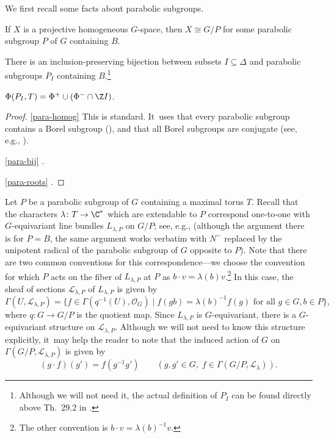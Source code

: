 \pagebreak[2]
We first recall some facts about parabolic subgroups.

\skpt
\begin{lem}\label{para-facts}
\begin{enumeratea}
\item\label{para-homog} If $X$ is a projective homogeneous $G$-space, then $X\cong G/P$ for some parabolic subgroup $P$ of $G$ containing $B$.

\item\label{para-bij} There is an inclusion-preserving bijection between subsets $I\subseteq \Delta$ and parabolic subgroups $P_I$ containing $B$.\footnote{Although we will not need it, the actual definition of $P_I$ can be found directly above Th.~29.2 in \cite{Hum75}.}
\item\label{para-roots} $\Phi(P_I, T) = \Phi^+\cup (\Phi^-\cap \Z I)$.
\end{enumeratea}
\end{lem}

\skpt
\begin{proof}
\eqref{para-homog} This is standard. It~uses that every parabolic subgroup contains a Borel subgroup (\cite[Cor.\,21.3.B.]{Hum75}), and that all Borel subgroups are conjugate (see, e.g., \cite[Th.\,21.3]{Hum75}).

\eqref{para-bij} \cite[Th.\,29.3]{Hum75}.

\eqref{para-roots} \cite[Th.\,30.1]{Hum75}.
\end{proof}

Let $P$ be a parabolic subgroup of $G$ containing a maximal torus $T$. Recall that the characters $\lambda\colon T\to \C^*$ which are extendable to $P$ correspond one-to-one with $G$-equivariant line bundles $L_{\lambda,P}$ on $G/P$; see, e.g., \cite[\S9.11]{Hotta} (although the argument there is for $P=B$, the same argument works verbatim with $N^{-}$ replaced by the unipotent radical of the parabolic subgroup of $G$ opposite to $P$). Note that there are two common conventions for this correspondence---we choose the convention for which $P$ acts on the fiber of $L_{\lambda,P}$ at $P$ as $b\cdot v = \lambda(b)v$.\footnote{The other convention is $b\cdot v = \lambda(b)^{-1}v$.} In this case, the sheaf of sections $\mathscr{L}_{\lambda,P}$ of $L_{\lambda,P}$ is given by
\begin{equation}\label{eq:borel-L-lambda}
\Gamma(U, \mathscr{L}_{\lambda,P}) = \{f\in \Gamma(q^{-1}(U), \mathscr{O}_G) \mid f(gb) = \lambda(b)^{-1}f(g)\text{ for all }g\in G, b\in P\},
\end{equation}
where $q\colon G\to G/P$ is the quotient map. Since $L_{\lambda,P}$ is $G$-equivariant, there is a $G$-equivariant structure on $\mathscr{L}_{\lambda,P}$. Although we will not need to know this structure explicitly, it~may help the reader to note that the induced action of $G$ on $\Gamma(G/P, \mathscr{L}_{\lambda,P})$ is given by
\begin{equation*}
(g\cdot f)(g') = f(g^{-1}g')\qquad (g,g'\in G,\; f\in \Gamma(G/P, \mathscr{L}_\lambda)).
\end{equation*}

